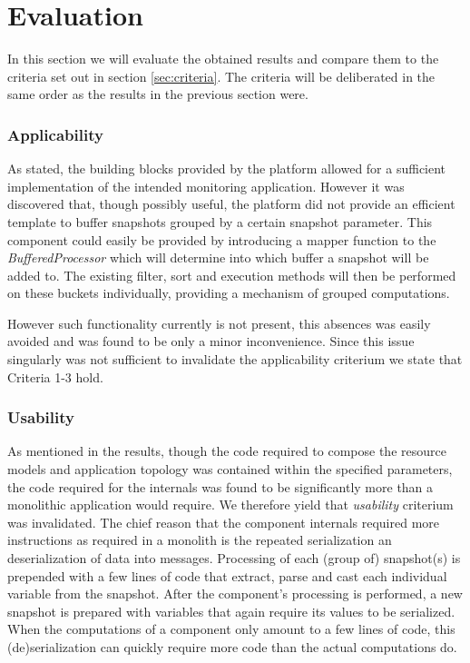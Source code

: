 \section{Evaluation}
\label{sec:eval}
In this section we will evaluate the obtained results and compare them to the criteria set out in section \ref{sec:criteria}. The criteria will be deliberated in the same order as the results in the previous section were.

\subsubsection{Applicability}
As stated, the building blocks provided by the platform allowed for a sufficient implementation of the intended monitoring application. However it was discovered that, though possibly useful, the platform did not provide an efficient template to buffer snapshots grouped by a certain snapshot parameter.  This component could easily be provided by introducing a mapper function to the \emph{BufferedProcessor} which will determine into which buffer a snapshot will be added to. The existing filter, sort and execution methods will then be performed on these buckets individually, providing a mechanism of grouped computations.

However such functionality currently is not present, this absences was easily avoided and was found to be only a minor inconvenience. Since this issue singularly was not sufficient to invalidate the applicability criterium we state that Criteria 1-3 hold.


\subsubsection{Usability}
As mentioned in the results, though the code required to compose the resource models and application topology was contained within the specified parameters, the code required for the internals was found to be significantly more than a monolithic application would require. We therefore yield that \emph{usability} criterium was invalidated. The chief reason that the component internals required  more instructions as required in a monolith is the repeated serialization an deserialization of data into messages. Processing of each (group of) snapshot(s) is prepended with a few lines of code that extract, parse and cast each individual variable from the snapshot. After the component's processing is performed, a new snapshot is prepared with variables that again require its values to be serialized. When the computations of a component only amount to a few lines of code, this (de)serialization can quickly require more code than the actual computations do.

